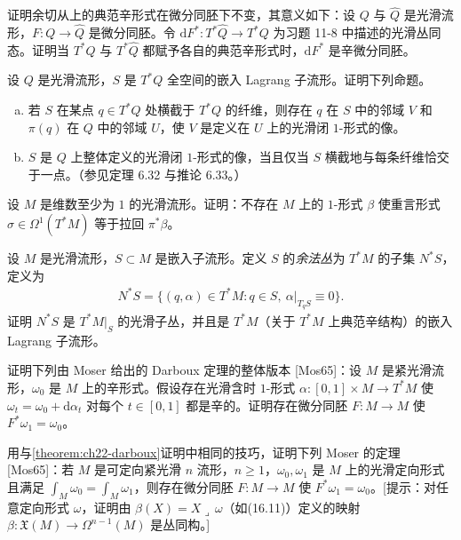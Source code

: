 \documentclass[../../main.tex]{subfiles}
\begin{document}
\begin{exercise}\label{exercise:ch22-p22-10}
证明余切从上的典范辛形式在微分同胚下不变，其意义如下：设 $Q$ 与 $\widehat Q$ 是光滑流形，$F:Q\to\widehat Q$ 是微分同胚。令 $\mathrm{d}F^*:T^*\widehat Q\to T^*Q$ 为习题 11-8 中描述的光滑丛同态。证明当 $T^*Q$ 与 $T^*\widehat Q$ 都赋予各自的典范辛形式时，$\mathrm{d}F^*$ 是辛微分同胚。
\end{exercise}

\begin{exercise}\label{exercise:ch22-p22-11}
设 $Q$ 是光滑流形，$S$ 是 $T^*Q$ 全空间的嵌入 Lagrang 子流形。证明下列命题。
\begin{enumerate}[(a)]
\item 若 $S$ 在某点 $q\in T^*Q$ 处横截于 $T^*Q$ 的纤维，则存在 $q$ 在 $S$ 中的邻域 $V$ 和 $\pi(q)$ 在 $Q$ 中的邻域 $U$，使 $V$ 是定义在 $U$ 上的光滑闭 $1$-形式的像。
\item $S$ 是 $Q$ 上整体定义的光滑闭 $1$-形式的像，当且仅当 $S$ 横截地与每条纤维恰交于一点。（参见定理 6.32 与推论 6.33。）
\end{enumerate}
\end{exercise}

\begin{exercise}\label{exercise:ch22-p22-12}
设 $M$ 是维数至少为 $1$ 的光滑流形。证明：不存在 $M$ 上的 $1$-形式 $\beta$ 使重言形式 $\sigma\in\Omega^1(T^*M)$ 等于拉回 $\pi^*\beta$。
\end{exercise}

\begin{exercise}\label{exercise:ch22-p22-13}
设 $M$ 是光滑流形，$S\subset M$ 是嵌入子流形。定义 $S$ 的\emph{余法丛}为 $T^*M$ 的子集 $N^*S$，定义为
\begin{align*}
N^*S=\{(q,\alpha)\in T^*M:q\in S,\ \alpha|_{T_qS}\equiv0\}.
\end{align*}
证明 $N^*S$ 是 $T^*M|_S$ 的光滑子丛，并且是 $T^*M$（关于 $T^*M$ 上典范辛结构）的嵌入 Lagrang 子流形。
\end{exercise}

\begin{exercise}\label{exercise:ch22-p22-14}
证明下列由 Moser 给出的 Darboux 定理的整体版本 [Mos65]：设 $M$ 是紧光滑流形，$\omega_0$ 是 $M$ 上的辛形式。假设存在光滑含时 $1$-形式 $\alpha:[0,1]\times M\to T^*M$ 使 $\omega_t=\omega_0+\mathrm{d}\alpha_t$ 对每个 $t\in[0,1]$ 都是辛的。证明存在微分同胚 $F:M\to M$ 使 $F^*\omega_1=\omega_0$。
\end{exercise}

\begin{exercise}\label{exercise:ch22-p22-15}
用与\cref{theorem:ch22-darboux}证明中相同的技巧，证明下列 Moser 的定理 [Mos65]：若 $M$ 是可定向紧光滑 $n$ 流形，$n\geqslant1$，$\omega_0,\omega_1$ 是 $M$ 上的光滑定向形式且满足 $\int_M\omega_0=\int_M\omega_1$，则存在微分同胚 $F:M\to M$ 使 $F^*\omega_1=\omega_0$。[提示：对任意定向形式 $\omega$，证明由 $\beta(X)=X\lrcorner\,\omega$（如(16.11)）定义的映射 $\beta:\mathfrak X(M)\to\Omega^{n-1}(M)$ 是丛同构。]
\end{exercise}
\end{document}
